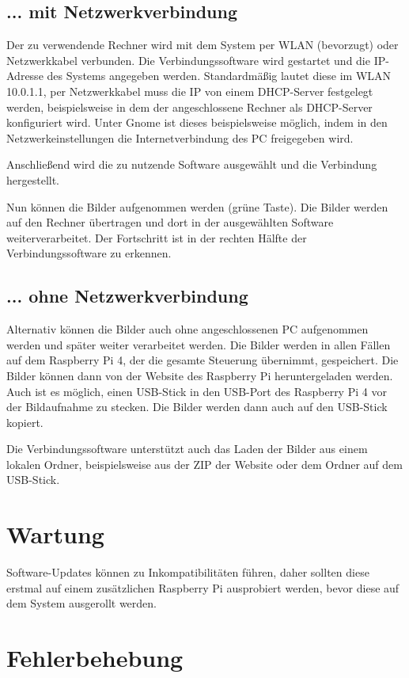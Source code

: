 \documentclass[./00PhotoBox.tex]{subfiles}
\begin{document}
\subsection{... mit Netzwerkverbindung}
Der zu verwendende Rechner wird mit dem System per WLAN (bevorzugt) oder Netzwerkkabel verbunden. Die Verbindungssoftware wird gestartet und die IP-Adresse des Systems angegeben werden. Standardmäßig lautet diese im WLAN 10.0.1.1, per Netzwerkkabel muss die IP von einem DHCP-Server festgelegt werden, beispielsweise in dem der angeschlossene Rechner als DHCP-Server konfiguriert wird. Unter Gnome ist dieses beispielsweise möglich, indem in den Netzwerkeinstellungen die Internetverbindung des PC freigegeben wird.

Anschließend wird die zu nutzende Software ausgewählt und die Verbindung hergestellt.

Nun können die Bilder aufgenommen werden (grüne Taste). Die Bilder werden auf den Rechner übertragen und dort in der ausgewählten Software weiterverarbeitet. Der Fortschritt ist in der rechten Hälfte der Verbindungssoftware zu erkennen.

\subsection{... ohne Netzwerkverbindung}
Alternativ können die Bilder auch ohne angeschlossenen PC aufgenommen werden und später weiter verarbeitet werden. Die Bilder werden in allen Fällen auf dem Raspberry Pi 4, der die gesamte Steuerung übernimmt, gespeichert. Die Bilder können dann von der Website des Raspberry Pi heruntergeladen werden. Auch ist es möglich, einen USB-Stick in den USB-Port des Raspberry Pi 4 vor der Bildaufnahme zu stecken. Die Bilder werden dann auch auf den USB-Stick kopiert.

Die Verbindungssoftware unterstützt auch das Laden der Bilder aus einem lokalen Ordner, beispielsweise aus der ZIP der Website oder dem Ordner auf dem USB-Stick.

\section{Wartung}
Software-Updates können zu Inkompatibilitäten führen, daher sollten diese erstmal auf einem zusätzlichen Raspberry Pi ausprobiert werden, bevor diese auf dem System ausgerollt werden.

\section{Fehlerbehebung}
\label{sec:Fehlerbehebung}
\end{document}
